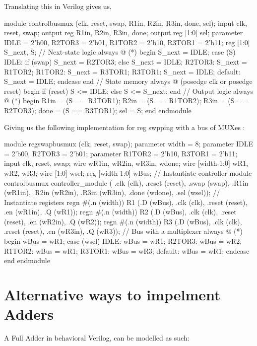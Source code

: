\documentclass[12pt,openany]{book}
\begin{document}
\begin{minipage}[htp]{1\textwidth}
	Translating this in Verilog gives us,
	\begin{vhdl}
module controlbusmux (clk, reset, swap, R1in, R2in, R3in, done, sel);
	input clk, reset, swap;
	output reg R1in, R2in, R3in, done;
	output reg [1:0] sel;
	parameter IDLE = 2'b00, R2TOR3 = 2'b01, R1TOR2 = 2'b10, R3TOR1 = 2'b11;
	reg [1:0] S_next, S;
	// Next-state logic
	always @ (*) begin
		S_next = IDLE;
		case (S)
		IDLE: if (swap) S_next = R2TOR3;
			  else S_next = IDLE;
		R2TOR3: S_next = R1TOR2;
		R1TOR2: S_next = R3TOR1;
		R3TOR1: S_next = IDLE;
		default: S_next = IDLE;
		endcase
	end
	// State memory
	always @ (posedge clk or posedge reset) begin
		if (reset) S <= IDLE;
		else S <= S_next;
	end
	// Output logic
	always @ (*) begin
		R1in = (S == R3TOR1);
		R2in = (S == R1TOR2);
		R3in = (S == R2TOR3);
		done = (S == R3TOR1);
		sel = S;
	end
endmodule
\end{vhdl}
\end{minipage}
\newpage
Giving us the following implementation for reg swpping with a bus of MUXes :
\begin{vhdl}
module regswapbusmux (clk, reset, swap);
		parameter width = 8;
		parameter IDLE = 2'b00, R2TOR3 = 2'b01;
		parameter R1TOR2 = 2'b10, R3TOR1 = 2'b11;
		input clk, reset, swap;
		wire wR1in, wR2in, wR3in, wdone;
		wire [width-1:0] wR1, wR2, wR3;
		wire [1:0] wsel;
		reg [width-1:0] wBus;
		// Instantiate controller module
		controlbusmux controller_module ( .clk (clk), .reset (reset), .swap (swap),
		.R1in (wR1in), .R2in (wR2in), .R3in (wR3in),
		.done (wdone), .sel (wsel));
		// Instantiate registers
		regn #(.n (width)) R1 (.D (wBus), .clk (clk), .reset (reset), .en (wR1in), .Q (wR1));
		regn #(.n (width)) R2 (.D (wBus), .clk (clk), .reset (reset), .en (wR2in), .Q (wR2));
		regn #(.n (width)) R3 (.D (wBus), .clk (clk), .reset (reset), .en (wR3in), .Q (wR3));
		// Bus with a multiplexer
		always @ (*) begin
			wBus = wR1;
			case (wsel)
				IDLE: wBus = wR1;
				R2TOR3: wBus = wR2;
				R1TOR2: wBus = wR1;
				R3TOR1: wBus = wR3;
				default: wBus = wR1;
			endcase
		end
endmodule
\end{vhdl}

\section{Alternative ways to impelment Adders}
A Full Adder in behavioral Verilog, can be modelled as such:
\end{document}
